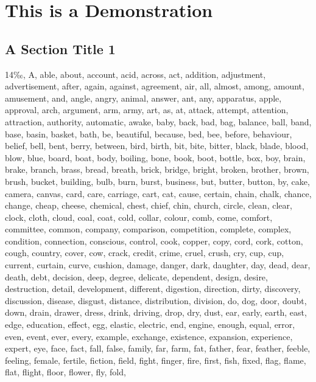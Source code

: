 

\chapter{This is a Demonstration 
}

\section{A Section Title 1 
}


14{\mktsFontfileOptima‰}, A, able, about, account, acid, across, act, addition, adjustment,
advertisement, after, again, against, agreement, air, all, almost, among,
amount, amusement, and, angle, angry, animal, answer, ant, any, apparatus,
apple, approval, arch, argument, arm, army, art, as, at, attack, attempt,
attention, attraction, authority, automatic, awake, baby, back, bad, bag,
balance, ball, band, base, basin, basket, bath, be, beautiful, because, bed,
bee, before, behaviour, belief, bell, bent, berry, between, bird, birth, bit,
bite, bitter, black, blade, blood, blow, blue, board, boat, body, boiling,
bone, book, boot, bottle, box, boy, brain, brake, branch, brass, bread,
breath, brick, bridge, bright, broken, brother, brown, brush, bucket,
building, bulb, burn, burst, business, but, butter, button, by, cake, camera,
canvas, card, care, carriage, cart, cat, cause, certain, chain, chalk, chance,
change, cheap, cheese, chemical, chest, chief, chin, church, circle, clean,
clear, clock, cloth, cloud, coal, coat, cold, collar, colour, comb, come,
comfort, committee, common, company, comparison, competition, complete,
complex, condition, connection, conscious, control, cook, copper, copy, cord,
cork, cotton, cough, country, cover, cow, crack, credit, crime, cruel, crush,
cry, cup, cup, current, curtain, curve, cushion, damage, danger, dark,
daughter, day, dead, dear, death, debt, decision, deep, degree, delicate,
dependent, design, desire, destruction, detail, development, different,
digestion, direction, dirty, discovery, discussion, disease, disgust,
distance, distribution, division, do, dog, door, doubt, down, drain, drawer,
dress, drink, driving, drop, dry, dust, ear, early, earth, east, edge,
education, effect, egg, elastic, electric, end, engine, enough, equal, error,
even, event, ever, every, example, exchange, existence, expansion, experience,
expert, eye, face, fact, fall, false, family, far, farm, fat, father, fear,
feather, feeble, feeling, female, fertile, fiction, field, fight, finger,
fire, first, fish, fixed, flag, flame, flat, flight, floor, flower, fly, fold,
